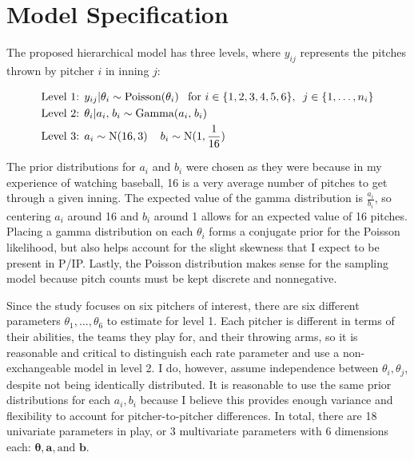 \documentclass{article}
\begin{document}
\section{Model Specification}

The proposed hierarchical model has three levels, where $y_{ij}$ represents the pitches thrown by pitcher $i$ in inning $j$: 

\begin{align}
    &\text{Level 1: } y_{ij} | \theta_i \sim \text{Poisson}(\theta_i) \hspace{8pt} \text{for } i \in \{1,2,3,4,5,6\}, \hspace{5pt} j \in \{1,\hdots,n_i\} \\
    &\text{Level 2: } \theta_i | a_i, \hspace{1pt} b_i \sim \text{Gamma}(a_i, \hspace{1pt} b_i) \\
    &\text{Level 3: } a_i \sim \text{N}(16, 3) \hspace{.4cm} b_i \sim \text{N}(1, \frac{1}{16})
\end{align}

The prior distributions for $a_i$ and $b_i$ were chosen as they were because in my experience of watching baseball, 16 is a very average number of pitches to get through a given inning. The expected value of the gamma distribution is $\frac{a_i}{b_i}$, so centering $a_i$ around 16 and $b_i$ around 1 allows for an expected value of 16 pitches. Placing a gamma distribution on each $\theta_i$ forms a conjugate prior for the Poisson likelihood, but also helps account for the slight skewness that I expect to be present in P/IP. Lastly, the Poisson distribution makes sense for the sampling model because pitch counts must be kept discrete and nonnegative.

Since the study focuses on six pitchers of interest, there are six different parameters $\theta_1,\hdots,\theta_6$ to estimate for level 1. Each pitcher is different in terms of their abilities, the teams they play for, and their throwing arms, so it is reasonable and critical to distinguish each rate parameter and use a non-exchangeable model in level 2. I do, however, assume independence between $\theta_i, \theta_j$, despite not being identically distributed. It is reasonable to use the same prior distributions for each $a_i,b_i$ because I believe this provides enough variance and flexibility to account for pitcher-to-pitcher differences. In total, there are 18 univariate parameters in play, or 3 multivariate parameters with 6 dimensions each: $\boldsymbol{\theta}, \mathbf{a}, \text{and } \mathbf{b}$.
\end{document}
